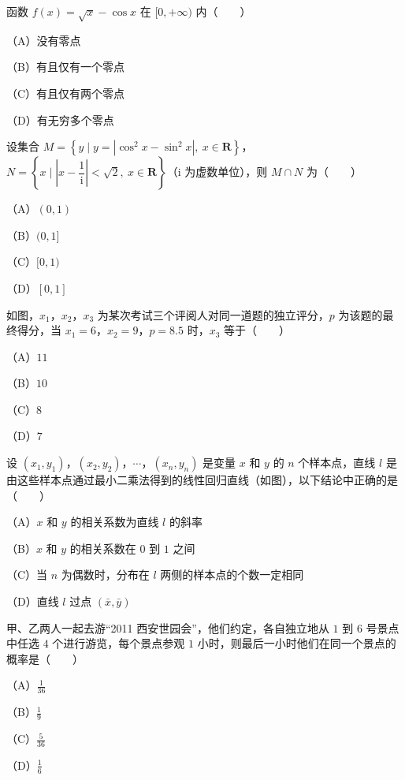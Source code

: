\begin{question}
函数 $f(x)=\sqrt x-\cos x$ 在 $[0,+\infty)$ 内\mbox{（　　）}

（A）没有零点

（B）有且仅有一个零点

（C）有且仅有两个零点

（D）有无穷多个零点

\end{question}
\begin{question}
设集合 $M=\left\{y\mid y=|\cos^2x-\sin^2x|,\ x\in\mathbf R\right\}$，$N=\left\{x\mid\left|x-\dfrac1{\mathrm i}\right|<\sqrt2,\ x\in\mathbf R\right\}$（$\mathrm i$ 为虚数单位），则 $M\cap N$ 为\mbox{（　　）}

（A）$(0,1)$

（B）$(0,1]$

（C）$[0,1)$

（D）$[0,1]$

\Needspace{0.4\textheight}
\end{question}
\begin{question}
如图，$x_1$，$x_2$，$x_3$ 为某次考试三个评阅人对同一道题的独立评分，$p$ 为该题的最终得分，当 $x_1=6$，$x_2=9$，$p=8.5$ 时，$x_3$ 等于\mbox{（　　）}

（A）$11$

（B）$10$

（C）$8$

（D）$7$
\nopagebreak[4]
\begin{center}\end{center}
\nopagebreak[4]
\Needspace{0.4\textheight}
\end{question}
\begin{question}
设 $(x_1,y_1)$，$(x_2,y_2)$，$\cdots$，$(x_n,y_n)$ 是变量 $x$ 和 $y$ 的 $n$ 个样本点，直线 $l$ 是由这些样本点通过最小二乘法得到的线性回归直线（如图），以下结论中正确的是\mbox{（　　）}

（A）$x$ 和 $y$ 的相关系数为直线 $l$ 的斜率

（B）$x$ 和 $y$ 的相关系数在 $0$ 到 $1$ 之间

（C）当 $n$ 为偶数时，分布在 $l$ 两侧的样本点的个数一定相同

（D）直线 $l$ 过点 $(\bar x,\bar y)$
\nopagebreak[4]
\begin{center}\end{center}
\nopagebreak[4]
\end{question}
\begin{question}
甲、乙两人一起去游“2011 西安世园会”，他们约定，各自独立地从 $1$ 到 $6$ 号景点中任选 $4$ 个进行游览，每个景点参观 $1$ 小时，则最后一小时他们在同一个景点的概率是\mbox{（　　）}

（A）$\frac1{36}$

（B）$\frac19$

（C）$\frac5{36}$

（D）$\frac16$

\end{question}

